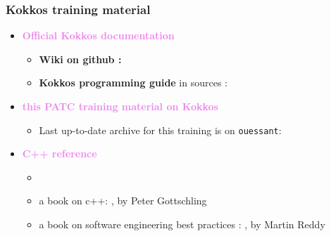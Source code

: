 \begin{frame}
  \frametitle{Kokkos training material}
  
  \begin{itemize}
  \item {\bf \textcolor{violet}{\large Official Kokkos documentation}}
    \begin{itemize}
    \item {\bf Wiki on github :} 
    \item {\bf Kokkos programming guide} in sources : 
    \end{itemize}
  \item {\bf \textcolor{violet}{\large this PATC training material on Kokkos}}
    \begin{itemize}
    \item Last up-to-date archive for this training is on \texttt{ouessant}:\\
    \end{itemize}
  \item {\bf \textcolor{violet}{\large C++ reference}}
    \begin{itemize}
    \item {}
    \item a book on c++: , by Peter Gottschling
    \item a book on software engineering best practices : , by Martin Reddy
    \end{itemize}
  \end{itemize}

\end{frame}

